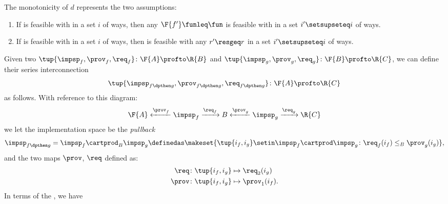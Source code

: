 \noindent The monotonicity of $d$ represents the two assumptions:
\begin{enumerate}
    \item If \fun is feasible with \res in a set $i$ of ways, then any $\F{f'}\funleq \fun$ is feasible with \res in a set $i'\setsupseteq i$ of ways.
    \item If \fun is feasible with \res in a set $i$ of ways, then \fun is feasible with any $r'\resgeq r$ in a set $i'\setsupseteq i$ of ways.
\end{enumerate}

\begin{definition}
    \label{def:seriesdpi}
    Given two  $\tup{\impsp_f,\prov_f,\req_f}\colon \F{A}\profto \R{B}$ and $\tup{\impsp_g,\prov_g,\req_g}\colon \F{B}\profto \R{C}$, we can define their series interconnection
    \begin{equation}
        \tup{\impsp_{f\dpthen g},\prov_{f\dpthen g},\req_{f\dpthen g}}\colon \F{A}\profto \R{C}
    \end{equation}
    as follows.
    With reference to this diagram:
    \begin{equation}
        \F{A} \xleftarrow{\prov_f} \impsp_f \xrightarrow{\req_f} B
        \xleftarrow{\prov_g} \impsp_g \xrightarrow{\req_g} \R{C}
    \end{equation}
    we let the implementation space be the \emph{pullback}
    \begin{equation}
        \begin{aligned}
            \impsp_{f\dpthen g} & = \impsp_f \cartprod_B \impsp_g \definedas \makeset{
                \tup{i_f,i_g} \setin \impsp_f \cartprod \impsp_g \colon
                \req_f(i_f) \leq_{B} \prov_g(i_g)
            }, \\
        \end{aligned}
    \end{equation}
    and the two maps $\prov$, $\req$ defined as:
    \begin{equation}
        \begin{aligned}
            \req  & \colon \tup{i_f,i_g} \mapsto \req_2(i_g) \\
            \prov & \colon \tup{i_f,i_g} \mapsto \prov_1(i_f).
        \end{aligned}
    \end{equation}
    In terms of the , we have
    \begin{widepar}

\end{widepar}
\end{definition}
